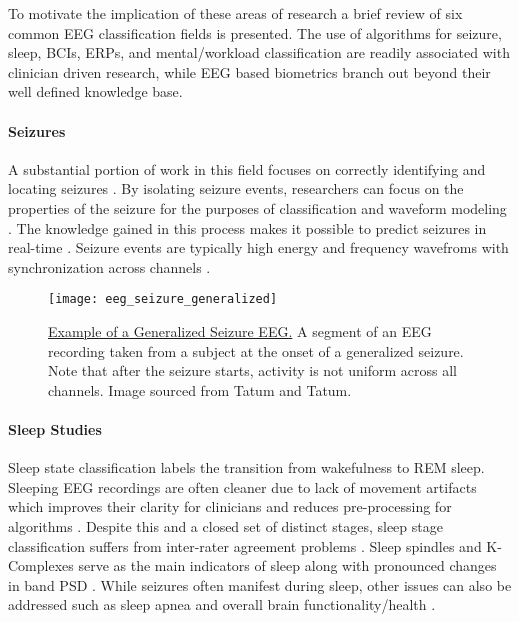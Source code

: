 To motivate the implication of these areas of research a brief review of six common \ac{EEG} classification fields is presented. The use of algorithms for seizure, sleep, \acp{BCI}, \acp{ERP}, and mental/workload classification are readily associated with clinician driven research, while \ac{EEG} based biometrics branch out beyond their well defined knowledge base.

\paragraph*{Seizures}
A substantial portion of work in this field focuses on correctly identifying and locating seizures \cite{Gardner2007,Subasi2007,Wulsin2012,Bogaarts2016}. By isolating seizure events, researchers can focus on the properties of the seizure for the purposes of classification and waveform modeling \cite{Wulsin2011,Blanco2011,Bajaj2012}. The knowledge gained in this process makes it possible to predict seizures in real-time \cite{Ramgopal2014,Chu2017}. Seizure events are typically high energy and frequency wavefroms with synchronization across channels \cite{Halford2015}.

\begin{figure}[h]
\centering
\texttt{[image: eeg\_seizure\_generalized]}
\caption[Example of a Generalized Seizure EEG]{\underline{Example of a Generalized Seizure EEG.} A segment of an \ac{EEG} recording taken from a subject at the onset of a generalized seizure. Note that after the seizure starts, activity is not uniform across all channels. Image sourced from Tatum and Tatum\cite{Tatum2014}. }
\label{fig:seizureExample}
\end{figure}

\paragraph*{Sleep Studies}
Sleep state classification labels the transition from wakefulness to \ac{REM} sleep. Sleeping \ac{EEG} recordings are often cleaner due to lack of movement artifacts which improves their clarity for clinicians and reduces pre-processing for algorithms \cite{Buckelmuller2006}. Despite this and a closed set of distinct stages, sleep stage classification suffers from inter-rater agreement problems \cite{Warby2014}. Sleep spindles and K-Complexes serve as the main indicators of sleep along with pronounced changes in band \acl{PSD} \cite{Wendt2012}. While seizures often manifest during sleep, other issues can also be addressed such as sleep apnea \cite{Schluter2012} and overall brain functionality/health \cite{Zygierewicz1999}.

